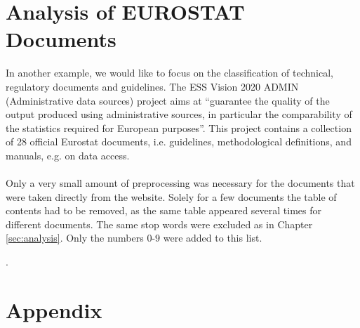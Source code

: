 \documentclass[11pt,a4paper]{article}
\begin{document}
\section{Analysis of EUROSTAT Documents}\label{sec:example2}

In another example, we would like to focus on the classification of technical, regulatory documents and guidelines. The ESS Vision 2020 ADMIN (Administrative data sources) project aims at “guarantee the quality of the output produced using administrative sources, in particular the comparability of the statistics required for European purposes”\cite{ESSVision2020}. This project contains a collection of 28 official Eurostat documents, i.e. guidelines, methodological definitions, and manuals, e.g. on data access.\\
\ \\
Only a very small amount of preprocessing was necessary for the documents that were taken directly from the website. Solely for a few documents the table of contents had to be removed, as the same table appeared several times for different documents. The same stop words were excluded as in Chapter \ref{sec:analysis}. Only the numbers $0$-$9$ were added to this list.




\newpage 
.
\newpage
\appendix
\section{Appendix}
	
  
  


\listoffigures
\listoftables

	
	
\end{document}
